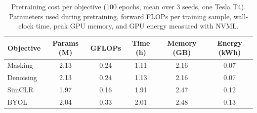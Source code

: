 \begin{table}[t]
\centering
\caption{Pretraining cost per objective (100 epochs, mean over 3 seeds, one Tesla T4). Parameters used during pretraining, forward FLOPs per training sample, wall-clock time, peak GPU memory, and GPU energy measured with NVML.}
\label{tab:compute}
\begin{tabular}{lccccc}
\toprule
Objective & Params (M) & GFLOPs & Time (h) & Memory (GB) & Energy (kWh) \\
\midrule
Masking & 2.13 & 0.24 & 1.11 & 2.16 & 0.07 \\
Denoising & 2.13 & 0.24 & 1.13 & 2.16 & 0.07 \\
SimCLR & 1.97 & 0.16 & 1.91 & 2.47 & 0.12 \\
BYOL & 2.04 & 0.33 & 2.01 & 2.48 & 0.13 \\
\bottomrule
\end{tabular}
\end{table}

